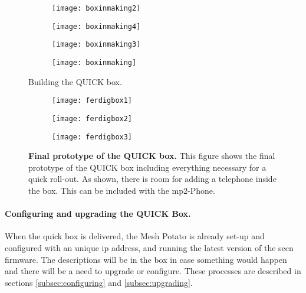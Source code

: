 \begin{figure}
        \centering
        \begin{subfigure}[t]{0.4\textwidth}
                \texttt{[image: boxinmaking2]}
                \label{fig:boxinmaking2}
        \end{subfigure}
        \begin{subfigure}[t]{0.4\textwidth}
                \texttt{[image: boxinmaking4]}
                \label{fig:boxinmaking}
        \end{subfigure}
         \begin{subfigure}[t]{0.3\textwidth}
                \texttt{[image: boxinmaking3]} 
                \label{fig:boxinmaking3}
        \end{subfigure}
        \begin{subfigure}[t]{0.4\textwidth}
                \texttt{[image: boxinmaking]} 
                \label{fig:boxinmaking4}
        \end{subfigure}
\caption{Building the QUICK box.} \label{fig:boxinmaking}
\end{figure}

\begin{figure}
        \centering
        \begin{subfigure}[t]{0.4\textwidth}
                \texttt{[image: ferdigbox1]}
                \label{fig:ferdigbox1}
        \end{subfigure}
        \begin{subfigure}[t]{0.4\textwidth}
                \texttt{[image: ferdigbox2]}
                \label{fig:ferdigbox2}
        \end{subfigure}
         \begin{subfigure}[t]{0.81\textwidth}
                \texttt{[image: ferdigbox3]} 
                \label{fig:ferdigbox3}
        \end{subfigure}
\caption[Final prototype of the QUICK box]{\textbf{Final prototype of the QUICK box.} This figure shows the final prototype of the QUICK box including everything necessary for a quick roll-out. As shown, there is room for adding a telephone inside the box. This can be included with the \gls{mp2}-Phone.} \label{fig:ferdigbox}
\end{figure}


\paragraph{Configuring and upgrading the QUICK Box.}
When the \gls{quick} box is delivered, the Mesh Potato is already set-up and configured with an unique \gls{ip} address, and running the latest version of the \gls{secn} firmware. The descriptions will be in the box in case something would happen and there will be a need to upgrade or configure. These processes are described in sections \ref{subsec:configuring} and \ref{subsec:upgrading}.

